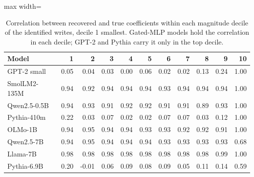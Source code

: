 \begin{table}[H]\centering\footnotesize
\caption{Correlation between recovered and true coefficients within each magnitude decile of the identified writes, decile 1 smallest. Gated-MLP models hold the correlation in each decile; GPT-2 and Pythia carry it only in the top decile.}\label{app:deciles}
\begin{adjustbox}{max width=\linewidth}
\begin{tabular}{lrrrrrrrrrr}\toprule
Model & 1 & 2 & 3 & 4 & 5 & 6 & 7 & 8 & 9 & 10 \\ \midrule
GPT-2 small & 0.05 & 0.04 & 0.03 & 0.00 & 0.06 & 0.02 & 0.02 & 0.13 & 0.24 & 1.00 \\
SmolLM2-135M & 0.94 & 0.92 & 0.94 & 0.94 & 0.94 & 0.93 & 0.94 & 0.94 & 0.94 & 1.00 \\
Qwen2.5-0.5B & 0.94 & 0.93 & 0.91 & 0.92 & 0.92 & 0.91 & 0.91 & 0.89 & 0.93 & 1.00 \\
Pythia-410m & 0.22 & 0.03 & 0.07 & 0.02 & 0.02 & 0.07 & 0.07 & 0.03 & 0.12 & 1.00 \\
OLMo-1B & 0.94 & 0.95 & 0.94 & 0.94 & 0.93 & 0.93 & 0.92 & 0.92 & 0.91 & 1.00 \\
Qwen2.5-7B & 0.94 & 0.95 & 0.94 & 0.94 & 0.94 & 0.93 & 0.93 & 0.93 & 0.93 & 0.68 \\
Llama-7B & 0.98 & 0.98 & 0.98 & 0.98 & 0.98 & 0.98 & 0.98 & 0.98 & 0.99 & 1.00 \\
Pythia-6.9B & 0.20 & -0.01 & 0.06 & 0.09 & 0.08 & 0.09 & 0.05 & 0.11 & 0.14 & 0.59 \\
\bottomrule\end{tabular}\end{adjustbox}
\end{table}

